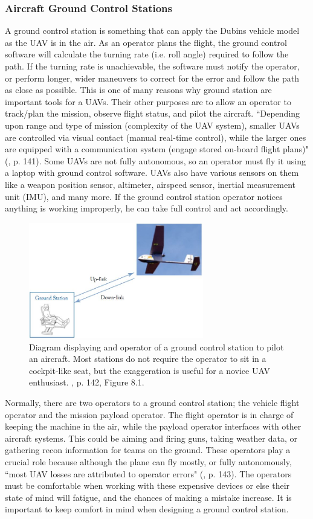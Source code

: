 \documentclass[12pt,journal,compsoc]{IEEEtran}
\begin{document}
\subsubsection{Aircraft Ground Control Stations}
A ground control station is something that can apply the Dubins vehicle model as the UAV is in the air. As an operator plans the flight, the ground control software will calculate the turning rate (i.e. roll angle) required to follow the path. If the turning rate is unachievable, the software must notify the operator, or perform longer, wider maneuvers to correct for the error and follow the path as close as possible. This is one of many reasons why ground station are important tools for a UAVs. Their other purposes are to allow an operator to track/plan the mission, observe flight status, and pilot the aircraft. ``Depending upon range and type of mission (complexity of the UAV system), smaller UAVs are controlled via visual contact (manual real-time control), while the larger ones are equipped with a communication system (engage stored on-board flight plans)" (\cite{U-A-D}, p. 141). Some UAVs are not fully autonomous, so an operator must fly it using a laptop with ground control software. UAVs also have various sensors on them like a weapon position sensor, altimeter, airspeed sensor, inertial measurement unit (IMU), and many more. If the ground control station operator notices anything is working improperly, he can take full control and act accordingly.
\begin{figure}[h!]
\hspace*{0cm}
\centering
\includegraphics[width=3in]{groundControl.jpg}
\caption{Diagram displaying and operator of a ground control station to pilot an aircraft. Most stations do not require the operator to sit in a cockpit-like seat, but the exaggeration is useful for a novice UAV enthusiast. \cite{U-A-D}, p. 142, Figure 8.1.}
\label{gcDiagram}
\end{figure}
Normally, there are two operators to a ground control station; the vehicle flight operator and the mission payload operator. The flight operator is in charge of keeping the machine in the air, while the payload operator interfaces with other aircraft systems. This could be aiming and firing guns, taking weather data, or gathering recon information for teams on the ground. These operators play a crucial role because although the plane can fly mostly, or fully autonomously, ``most UAV losses are attributed to operator errors" (\cite{U-A-D}, p. 143). The operators must be comfortable when working with these expensive devices or else their state of mind will fatigue, and the chances of making a mistake increase. It is important to keep comfort in mind when designing a ground control station.
\end{document}

